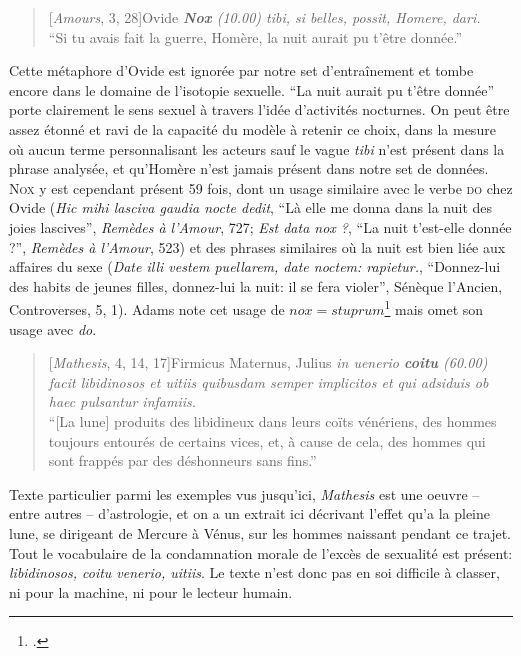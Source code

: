 \begin{quote}[\textit{Amours}, 3, 28]{Ovide}
    \textit{\textbf{Nox} (10.00) tibi, si belles, possit, Homere, dari.} \\
    \enquote{Si tu avais fait la guerre, Homère, la nuit aurait pu t'être donnée.}
\end{quote}

Cette métaphore d'Ovide est ignorée par notre set d'entraînement et tombe encore dans le domaine de l'isotopie sexuelle. ``La nuit aurait pu t'être donnée'' porte clairement le sens sexuel à travers l'idée d'activités nocturnes. On peut être assez étonné et ravi de la capacité du modèle à retenir ce choix, dans la mesure où aucun terme personnalisant les acteurs sauf le vague \textit{tibi} n'est présent dans la phrase analysée, et qu'Homère n'est jamais présent dans notre set de données. \textsc{Nox} y est cependant présent 59 fois, dont un usage similaire avec le verbe \textsc{do} chez Ovide (\textit{Hic mihi lasciva gaudia nocte dedit}, ``Là elle me donna dans la nuit des joies lascives'', \textit{Remèdes à l'Amour}, 727; \textit{Est data nox ?}, ``La nuit t'est-elle donnée ?'', \textit{Remèdes à l'Amour}, 523) et des phrases similaires où la nuit est bien liée aux affaires du sexe (\textit{Date illi vestem puellarem, date noctem: rapietur.}, ``Donnez-lui des habits de jeunes filles, donnez-lui la nuit: il se fera violer'', Sénèque l'Ancien, Controverses, 5, 1). Adams note cet usage de $nox=stuprum$\footcite[p.178]{adams} mais omet son usage avec \textit{do}.

\begin{quote}[\textit{Mathesis}, 4, 14, 17]{Firmicus Maternus, Julius}
    \textit{in uenerio \textbf{coitu} (60.00) facit libidinosos et uitiis quibusdam semper implicitos et qui adsiduis ob haec pulsantur infamiis.} \\
    \enquote{[La lune] produits des libidineux dans leurs coïts vénériens, des hommes toujours entourés de certains vices, et, à cause de cela, des hommes qui sont frappés par des déshonneurs sans fins.}
\end{quote}

Texte particulier parmi les exemples vus jusqu'ici, \textit{Mathesis} est une oeuvre -- entre autres -- d'astrologie, et on a un extrait ici décrivant l'effet qu'a la pleine lune, se dirigeant de Mercure à Vénus, sur les hommes naissant pendant ce trajet. Tout le vocabulaire de la condamnation morale de l'excès de sexualité est présent: \textit{libidinosos, coitu venerio, uitiis}. %
Le texte n'est donc pas en soi difficile à classer, ni pour la machine, ni pour le lecteur humain.

